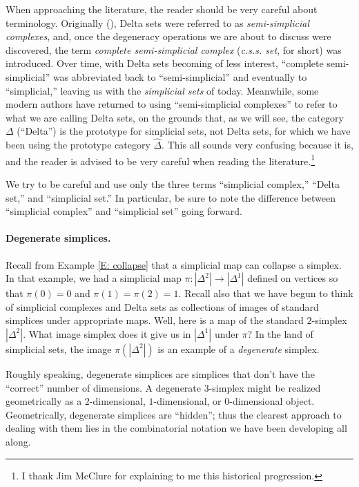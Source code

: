 \documentclass[12pt]{article}
\theoremstyle{plain}
\theoremstyle{definition}
\theoremstyle{remark}
\begin{document}
When approaching the literature, the reader should be very careful about terminology. Originally (\cite{EZ50}), Delta sets were referred to as \emph{semi-simplicial complexes}, and, once the degeneracy operations we are about to discuss were discovered, the term \emph{complete semi-simplicial complex} (\emph{c.s.s. set}, for short) was introduced. Over time, with Delta sets becoming of less interest,  ``complete semi-simplicial'' was abbreviated back to ``semi-simplicial'' and eventually to ``simplicial,'' leaving us with the \emph{simplicial sets} of today. Meanwhile, some modern authors have returned to using ``semi-simplicial complexes'' to refer to what we are calling Delta sets, on the grounds that, as we will see, the category $\Delta$ (``Delta'') is the prototype for simplicial sets, not Delta sets, for which we have been using the prototype category $\widehat \Delta$. This all sounds very confusing because it is, and the reader is advised to be very careful when reading the literature.\footnote{I thank Jim McClure for explaining to me this historical progression.}

We try to be careful and use only the three terms ``simplicial complex,'' ``Delta set,'' and ``simplicial set.'' In particular, be sure to note the difference between  ``simplicial complex'' and ``simplicial set'' going forward.









\paragraph{Degenerate simplices.}

Recall from Example \ref{E: collapse} that a simplicial map can collapse a simplex. In that example, we had a simplicial map $\pi\colon|\Delta^2|\to|\Delta^1|$ defined on vertices so that $\pi(0)=0$ and $\pi(1)=\pi(2)=1$. Recall also that we have begun to think of simplicial complexes and Delta sets as collections of images of standard simplices under appropriate maps. Well, here is a map of the standard $2$-simplex $|\Delta^2|$. What image simplex does it give us in $|\Delta^1|$ under $\pi$? In the land of simplicial sets, the image $\pi(|\Delta^2|)$ is an example of a \emph{degenerate} simplex.


Roughly speaking, degenerate simplices are simplices that don't have the ``correct'' number of dimensions. A degenerate $3$-simplex might be realized geometrically as a $2$-dimensional, $1$-dimensional, or $0$-dimensional object. Geometrically, degenerate simplices are ``hidden''; thus the clearest approach to dealing with them lies in the combinatorial notation we have been developing all along. 
\end{document}
